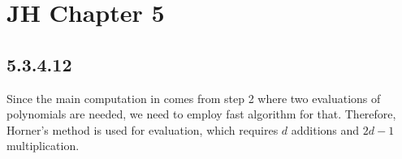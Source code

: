 \documentclass[twocolumn]{article}
\begin{document}
	\section*{JH Chapter 5}
	\subsection*{5.3.4.12}
	Since the main computation in  comes from step 2 where two evaluations of polynomials are needed, we need to employ fast algorithm for that. Therefore, Horner's method is used for evaluation, which requires $d$ additions and $2d-1$ multiplication.
\end{document}
